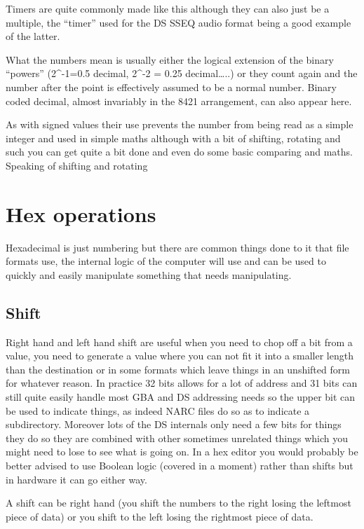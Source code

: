 \documentclass[
]{book}
\begin{document}
Timers are quite commonly made like this although they can also just be a multiple, the ``timer'' used for the DS SSEQ audio format being a good example of the latter.

What the numbers mean is usually either the logical extension of the binary ``powers'' (2\^{}-1=0.5 decimal, 2\^{}-2 = 0.25 decimal\ldots..) or they count again and the number after the point is effectively assumed to be a normal number. Binary coded decimal, almost invariably in the 8421 arrangement, can also appear here.

As with signed values their use prevents the number from being read as a simple integer and used in simple maths although with a bit of shifting, rotating and such you can get quite a bit done and even do some basic comparing and maths. Speaking of shifting and rotating

\hypertarget{hex-operations}{%
\section{Hex operations}\label{hex-operations}}

Hexadecimal is just numbering but there are common things done to it that file formats use, the internal logic of the computer will use and can be used to quickly and easily manipulate something that needs manipulating.

\hypertarget{shift}{%
\subsection{Shift}\label{shift}}

Right hand and left hand shift are useful when you need to chop off a bit from a value, you need to generate a value where you can not fit it into a smaller length than the destination or in some formats which leave things in an unshifted form for whatever reason. In practice 32 bits allows for a lot of address and 31 bits can still quite easily handle most GBA and DS addressing needs so the upper bit can be used to indicate things, as indeed NARC files do so as to indicate a subdirectory. Moreover lots of the DS internals only need a few bits for things they do so they are combined with other sometimes unrelated things which you might need to lose to see what is going on. In a hex editor you would probably be better advised to use Boolean logic (covered in a moment) rather than shifts but in hardware it can go either way.

A shift can be right hand (you shift the numbers to the right losing the leftmost piece of data) or you shift to the left losing the rightmost piece of data.
\end{document}
